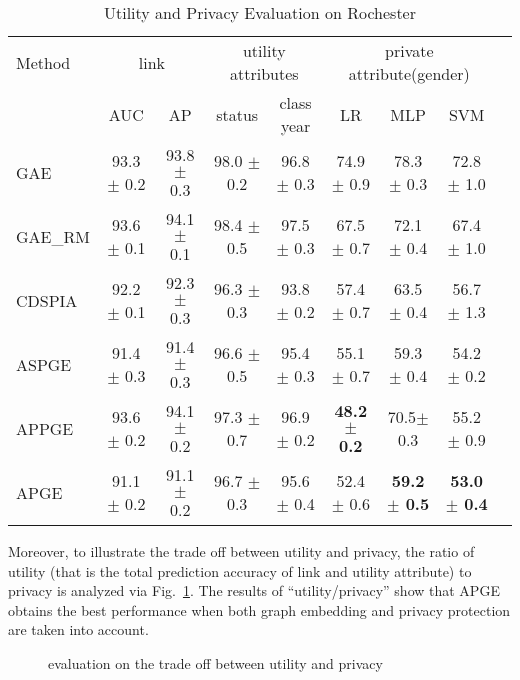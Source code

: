 \documentclass{article}
\begin{document}
%
\begin{table}
\small
  \caption{Utility and Privacy Evaluation on Rochester}
  \label{Tab:Rochester}
  \centering
  \begin{tabular}{lcccccccc}
    \toprule
     Method & \multicolumn{2}{c}{link} & \multicolumn{2}{c}{utility attributes} &\multicolumn{3}{c}{private attribute(gender)}                  \\
    \cmidrule(r){2-3} \cmidrule(r){4-5} \cmidrule(r){6-8}
       & AUC  &AP     &status &class year  &LR  &MLP &SVM  \\
    \midrule
    GAE   &93.3 $\pm$ 0.2  &93.8 $\pm$ 0.3 &98.0 $\pm$ 0.2 &96.8 $\pm$ 0.3 &74.9 $\pm$ 0.9 &78.3 $\pm$ 0.3 &72.8 $\pm$ 1.0\\
    GAE\_RM  &93.6 $\pm$  0.1 &94.1 $\pm$ 0.1 &98.4 $\pm$ 0.5 &97.5 $\pm$  0.3 &67.5 $\pm$ 0.7 &72.1 $\pm$ 0.4 &67.4 $\pm$ 1.0\\
    CDSPIA  &92.2 $\pm$ 0.1 &92.3 $\pm$ 0.3 &96.3 $\pm$  0.3 &93.8 $\pm$ 0.2 &57.4 $\pm$ 0.7 &63.5 $\pm$ 0.4 &56.7 $\pm$ 1.3\\
    ASPGE     &91.4 $\pm$ 0.3 &91.4 $\pm$ 0.3 &96.6 $\pm$ 0.5 &95.4 $\pm$ 0.3 &55.1 $\pm$ 0.7 &59.3  $\pm$ 0.4 &54.2 $\pm$ 0.2\\
    APPGE     &93.6 $\pm$ 0.2 &94.1 $\pm$ 0.2 &97.3  $\pm$ 0.7 &96.9 $\pm$ 0.2  &\textbf{48.2 $\pm$  0.2}   &70.5$\pm$  0.3 &55.2 $\pm$ 0.9\\
    APGE     &91.1  $\pm$ 0.2 &91.1 $\pm$ 0.2 &96.7 $\pm$ 0.3 &95.6 $\pm$ 0.4 &52.4 $\pm$ 0.6 &\textbf{59.2 $\pm$ 0.5} &\textbf{53.0 $\pm$ 0.4}\\
    \bottomrule
  \end{tabular}
\end{table}


Moreover, to illustrate the trade off between utility and privacy, the ratio of utility (that is the total prediction accuracy of link and utility attribute) to privacy is analyzed via Fig.~\ref{fig:u_p}. The results of ``utility/privacy'' show that APGE obtains the best performance when both graph embedding and privacy protection are taken into account.
%
\begin{figure}[!ht]
     \hfill
     \caption{evaluation on the trade off between utility and privacy}
     \label{fig:u_p}
   \end{figure}
\end{document}
